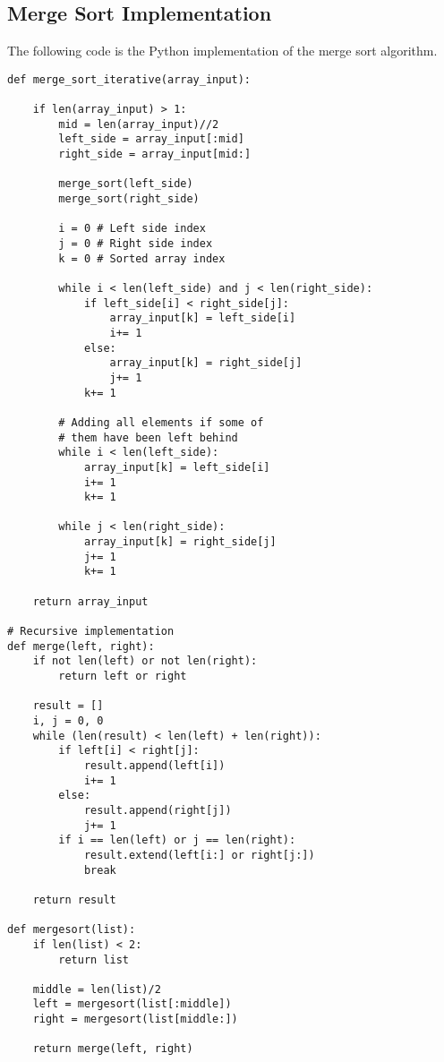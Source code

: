 \subsection{Merge Sort Implementation}
The following code is the Python implementation of the merge sort algorithm.
\begin{lstlisting}[firstnumber=1, caption={Merge sort Python implementation (the recursive part is taken from \href{https://www.geeksforgeeks.org/iterative-merge-sort/}{Merge Sort, GeeksforGeeks}).}]
def merge_sort_iterative(array_input):
	
	if len(array_input) > 1:
		mid = len(array_input)//2
		left_side = array_input[:mid]
		right_side = array_input[mid:]
		
		merge_sort(left_side)
		merge_sort(right_side)
		
		i = 0 # Left side index
		j = 0 # Right side index
		k = 0 # Sorted array index
		
		while i < len(left_side) and j < len(right_side):
			if left_side[i] < right_side[j]:
				array_input[k] = left_side[i]
				i+= 1
			else:
				array_input[k] = right_side[j]
				j+= 1
			k+= 1
			
		# Adding all elements if some of 
        # them have been left behind 
        while i < len(left_side): 
        	array_input[k] = left_side[i] 
            i+= 1
            k+= 1
            
        while j < len(right_side): 
        	array_input[k] = right_side[j] 
            j+= 1
            k+= 1
			
	return array_input
	
# Recursive implementation
def merge(left, right):
    if not len(left) or not len(right):
        return left or right
 
    result = []
    i, j = 0, 0
    while (len(result) < len(left) + len(right)):
        if left[i] < right[j]:
            result.append(left[i])
            i+= 1
        else:
            result.append(right[j])
            j+= 1
        if i == len(left) or j == len(right):
            result.extend(left[i:] or right[j:])
            break
 
    return result
 
def mergesort(list):
    if len(list) < 2:
        return list
 
    middle = len(list)/2
    left = mergesort(list[:middle])
    right = mergesort(list[middle:])
 
    return merge(left, right)
\end{lstlisting}

